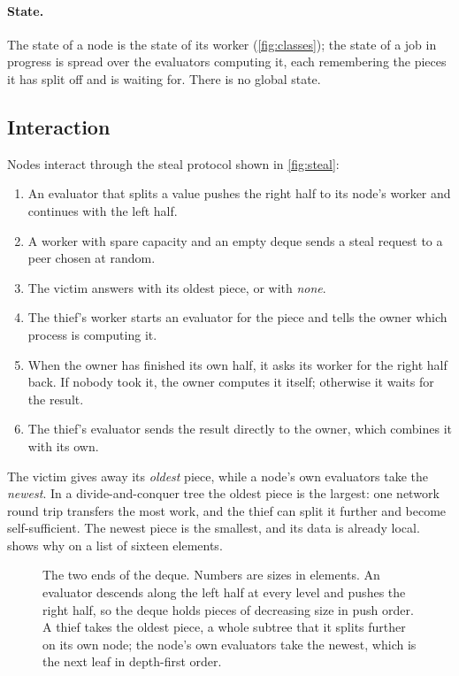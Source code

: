 \documentclass{scrartcl}
\begin{document}
\paragraph{State.}
The state of a node is the state of its worker (\cref{fig:classes}); the state of a job in progress is spread over the evaluators computing it, each remembering the pieces it has split off and is waiting for.
%
There is no global state.

\subsection{Interaction}\label{interaction}

Nodes interact through the steal protocol shown in \cref{fig:steal}:
%
\begin{enumerate}
  \item An evaluator that splits a value pushes the right half to its node's worker and continues with the left half.
  \item A worker with spare capacity and an empty deque sends a steal request to a peer chosen at random.
  \item The victim answers with its oldest piece, or with \emph{none}.
  \item The thief's worker starts an evaluator for the piece and tells the owner which process is computing it.
  \item When the owner has finished its own half, it asks its worker for the right half back. If nobody took it, the owner computes it itself; otherwise it waits for the result.
  \item The thief's evaluator sends the result directly to the owner, which combines it with its own.
\end{enumerate}

The victim gives away its \emph{oldest} piece, while a node's own evaluators take the \emph{newest}.
%
In a divide-and-conquer tree the oldest piece is the largest: one network round trip transfers the most work, and the thief can split it further and become self-sufficient.
%
The newest piece is the smallest, and its data is already local.
%
 shows why on a list of sixteen elements.

\begin{figure}[tbp]
  \centering
  
  \caption{The two ends of the deque. Numbers are sizes in elements. An evaluator descends along the left half at every level and pushes the right half, so the deque holds pieces of decreasing size in push order. A thief takes the oldest piece, a whole subtree that it splits further on its own node; the node's own evaluators take the newest, which is the next leaf in depth-first order.}
  \label{fig:deque}
\end{figure}
\end{document}
